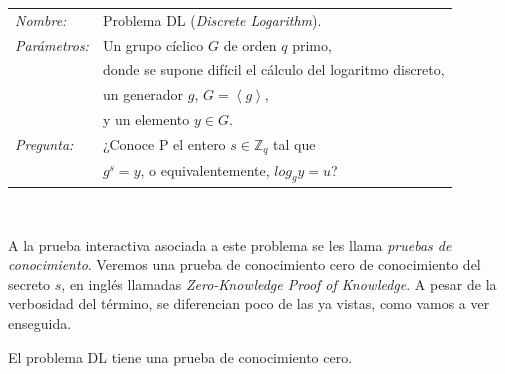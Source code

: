 \hfil

\begin{tabular}{|ll}
	\textit{Nombre:} & Problema DL (\textit{Discrete Logarithm}). \\
	\textit{Parámetros:} & Un grupo cíclico $G$ de orden $q$ primo, \\ & donde se supone difícil el cálculo del logaritmo discreto,  \\ & un generador $g$, $G=\left\langle g \right\rangle$,\\ & y un elemento $y\in G$. \\
	\textit{Pregunta:} & ¿Conoce P el entero $s\in \mathbb{Z}_q$ tal que \\ & $g^s = y$, o equivalentemente, $log_g y = u$? \\
\end{tabular}
\\

\hfil

A la prueba interactiva asociada a este problema se les llama \textit{pruebas de conocimiento}. Veremos una prueba de conocimiento  cero de conocimiento del secreto $s$, en inglés llamadas \textit{Zero-Knowledge Proof of Knowledge}. A pesar de la verbosidad del término, se diferencian poco de las ya vistas, como vamos a ver enseguida.


\begin{theorem}
	El problema DL tiene una prueba de conocimiento cero.
\end{theorem}


